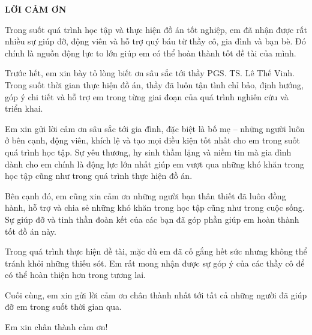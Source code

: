 \documentclass[../DoAn.tex]{subfiles}
\begin{document}
\begin{center}
    \Large{\textbf{LỜI CẢM ƠN}}\\
\end{center}
\vspace{1cm}
Trong suốt quá trình học tập và thực hiện đồ án tốt nghiệp, em đã nhận được rất nhiều sự giúp đỡ, động viên và hỗ trợ quý báu từ thầy cô, gia đình và bạn bè. Đó chính là nguồn động lực to lớn giúp em có thể hoàn thành tốt đề tài của mình.

Trước hết, em xin bày tỏ lòng biết ơn sâu sắc tới thầy PGS. TS. Lê Thế Vinh. Trong suốt thời gian thực hiện đồ án, thầy đã luôn tận tình chỉ bảo, định hướng, góp ý chi tiết và hỗ trợ em trong từng giai đoạn của quá trình nghiên cứu và triển khai.

Em xin gửi lời cảm ơn sâu sắc tới gia đình, đặc biệt là bố mẹ – những người luôn ở bên cạnh, động viên, khích lệ và tạo mọi điều kiện tốt nhất cho em trong suốt quá trình học tập. Sự yêu thương, hy sinh thầm lặng và niềm tin mà gia đình dành cho em chính là động lực lớn nhất giúp em vượt qua những khó khăn trong học tập cũng như trong quá trình thực hiện đồ án.

Bên cạnh đó, em cũng xin cảm ơn những người bạn thân thiết đã luôn đồng hành, hỗ trợ và chia sẻ những khó khăn trong học tập cũng như trong cuộc sống. Sự giúp đỡ và tinh thần đoàn kết của các bạn đã góp phần giúp em hoàn thành tốt đồ án này.

Trong quá trình thực hiện đề tài, mặc dù em đã cố gắng hết sức nhưng không thể tránh khỏi những thiếu sót. Em rất mong nhận được sự góp ý của các thầy cô để có thể hoàn thiện hơn trong tương lai.

Cuối cùng, em xin gửi lời cảm ơn chân thành nhất tới tất cả những người đã giúp đỡ em trong suốt thời gian qua.

Em xin chân thành cảm ơn!
\end{document}
